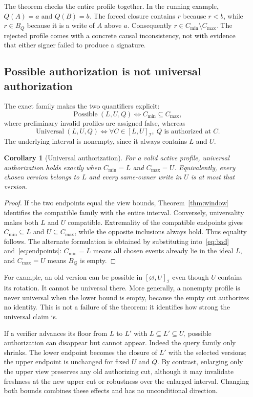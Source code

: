 \documentclass[11pt]{article}
\newtheorem{corollary}[theorem]{Corollary}
\theoremstyle{definition}
\newcommand{\Id}{\mathcal I}
\newcommand{\lo}{C_{\min}}
\newcommand{\hi}{C_{\max}}
\begin{document}
The theorem checks the entire profile together. In the running example, $Q(A)=a$ and $Q(B)=b$. The forced closure contains $r$ because $r<b$, while $r\in B_Q$ because it is a write of $A$ above $a$. Consequently $r\in\lo\setminus\hi$. The rejected profile comes with a concrete causal inconsistency, not with evidence that either signer failed to produce a signature.

\subsection{Possible authorization is not universal authorization}
The exact family makes the two quantifiers explicit:
\[
 \operatorname{Possible}(L,U,Q)\iff\lo\subseteq\hi,
\]
where preliminary invalid profiles are assigned false, whereas
\[
 \operatorname{Universal}(L,U,Q)
 \iff \forall C\in[L,U]_{\Id},\ Q\text{ is authorized at }C.
\]
The underlying interval is nonempty, since it always contains $L$ and $U$.

\begin{corollary}[Universal authorization]\label{cor:universal}
For a valid active profile, universal authorization holds exactly when $\lo=L$ and $\hi=U$. Equivalently, every chosen version belongs to $L$ and every same-owner write in $U$ is at most that version.
\end{corollary}
\begin{proof}
If the two endpoints equal the view bounds, Theorem~\ref{thm:window} identifies the compatible family with the entire interval. Conversely, universality makes both $L$ and $U$ compatible. Extremality of the compatible endpoints gives $\lo\subseteq L$ and $U\subseteq\hi$, while the opposite inclusions always hold. Thus equality follows. The alternate formulation is obtained by substituting into~\eqref{eq:bad} and~\eqref{eq:endpoints}: $\lo=L$ means all chosen events already lie in the ideal $L$, and $\hi=U$ means $B_Q$ is empty.
\end{proof}

For example, an old version can be possible in $[\varnothing,U]_{\Id}$ even though $U$ contains its rotation. It cannot be universal there. More generally, a nonempty profile is never universal when the lower bound is empty, because the empty cut authorizes no identity. This is not a failure of the theorem: it identifies how strong the universal claim is.

If a verifier advances its floor from $L$ to $L'$ with $L\subseteq L'\subseteq U$, possible authorization can disappear but cannot appear. Indeed the query family only shrinks. The lower endpoint becomes the closure of $L'$ with the selected versions; the upper endpoint is unchanged for fixed $U$ and $Q$. By contrast, enlarging only the upper view preserves any old authorizing cut, although it may invalidate freshness at the new upper cut or robustness over the enlarged interval. Changing both bounds combines these effects and has no unconditional direction.
\end{document}
